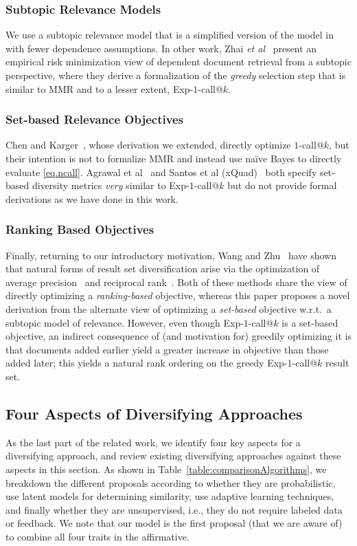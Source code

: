 \subsubsection{Subtopic Relevance Models} 
We use a subtopic relevance
model that is a simplified version of the model in~\cite{plmmr} with
fewer dependence assumptions.  In other work, Zhai {\it et
al}~\cite{zhai03Beyond} present an empirical risk minimization view of
dependent document retrieval from a subtopic perspective,
where they derive a formalization of the
\emph{greedy} selection step that is similar to MMR and to a lesser
extent, Exp-$1$-call@$k$.

\subsubsection{Set-based Relevance Objectives} 
Chen and Karger~\cite{chen06Less}, whose derivation we extended, directly
optimize $1$-call@$k$, but their intention is not to formalize MMR and
instead use na\"{i}ve Bayes to directly evaluate
\eqref{eq.ncall}.  Agrawal et al~\cite{agrawal09Diversifying}
and Santos et al (xQuad)~\cite{santos2010xquad} both specify set-based
diversity metrics \emph{very} similar to Exp-$1$-call@$k$ but do not provide
formal derivations as we have done in this work. 

\subsubsection{Ranking Based Objectives} 
Finally, returning to our introductory motivation, Wang and Zhu~\cite{wangzhu10} have shown that
natural forms of result set diversification arise via the optimization
of average precision~\cite{ap} and reciprocal rank~\cite{mrr}.  Both
of these methods share the view of directly optimizing a
\emph{ranking-based} objective, whereas this paper proposes a novel
derivation from the alternate view of optimizing a \emph{set-based}
objective w.r.t.\ a subtopic model of relevance.  However, even though
Exp-$1$-call@$k$ is a set-based objective, an indirect consequence of
(and motivation for) greedily optimizing it is that documents added
earlier yield a greater increase in objective than those added later;
this yields a natural rank ordering on the greedy Exp-$1$-call@$k$
result set.

\subsection{Four Aspects of Diversifying Approaches}
As the last part of the related work, we identify four key aspects for a diversifying approach, and review existing diversifying approaches against these aspects in this section. As shown in Table~\ref{table:comparisonAlgorithms}, we breakdown the
different proposals according to whether they are probabilistic, use
latent models for determining similarity, use adaptive learning
techniques, and finally whether they are unsupervised, i.e., they do
not require labeled data or feedback. We note that our model is the first
proposal (that we are aware of) to combine all four traits in the
affirmative. 

